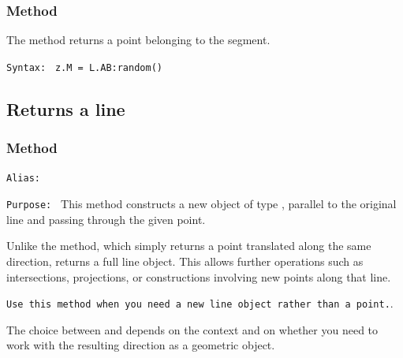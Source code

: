 \subsubsection{Method }
\label{ssub:method_line_random}
The method returns a point belonging to the segment.

\medskip
\texttt{Syntax: } \verb|z.M = L.AB:random()|


\subsection{Returns a line}

\subsubsection{Method } %
\label{ssub_line_from_a_defined_line}

\medskip
\texttt{Alias: } 


\texttt{Purpose: } This method constructs a new object of type , parallel to the original line and passing through the given point.

\medskip

Unlike the  method, which simply returns a point translated along the same direction,  returns a full line object. This allows further operations such as intersections, projections, or constructions involving new points along that line.

\medskip

\texttt{Use this method when you need a new line object rather than a point.}.

 The choice between  and  depends on the context and on whether you need to work with the resulting direction as a geometric object.

\begin{minipage}{.5\textwidth}
\begin{center}
\end{center}
\end{minipage}
\begin{minipage}{.5\textwidth}
\begin{tkzexample}
\end{tkzexample}
\end{minipage}


